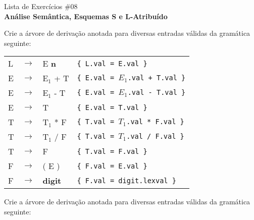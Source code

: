 \documentclass{compiladores}
\begin{document}
\begin{center}
{\LARGE Lista de Exercícios \#08}\\
{\bf Análise Semântica, Esquemas S e L-Atribuído}
\end{center}

\bigskip

\begin{listanumerada}
\item \label{x} Crie a árvore de derivação anotada para diversas entradas válidas da gramática seguinte:

  \begin{tabular}{llll}
    L  &  $\rightarrow$  &  E \textbf{n}    &  \texttt{\{ L.val = E.val   \}}            \\
    E  &  $\rightarrow$  &  E$_1$ + T       &  \texttt{\{ E.val = $E_1$.val + T.val \}}  \\
    E  &  $\rightarrow$  &  E$_1$ - T       &  \texttt{\{ E.val = $E_1$.val - T.val \}}  \\
    E  &  $\rightarrow$  &  T               &  \texttt{\{ E.val = T.val          \}}     \\
    T  &  $\rightarrow$  &  T$_1$ * F       &  \texttt{\{ T.val = $T_1$.val * F.val \}}  \\
    T  &  $\rightarrow$  &  T$_1$ / F       &  \texttt{\{ T.val = $T_1$.val / F.val \}}  \\
    T  &  $\rightarrow$  &  F               &  \texttt{\{ T.val = F.val           \}}    \\
    F  &  $\rightarrow$  &  ( E )           &  \texttt{\{ F.val = E.val          \}}     \\
    F  &  $\rightarrow$  &  \textbf{digit}  &  \texttt{\{ F.val = digit.lexval    \}}    \\
  \end{tabular}

\item \label{y} Crie a árvore de derivação anotada para diversas entradas válidas da gramática seguinte:


\end{listanumerada}
\end{document}

